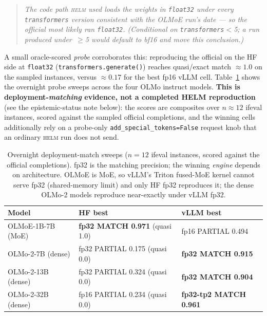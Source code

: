 \documentclass[11pt]{report}
\newcommand{\code}[1]{\texttt{#1}}
\begin{document}
\begin{quote}\itshape
The code path \textsc{helm} used loads the weights in \code{float32} under every
\code{transformers} version consistent with the OLMoE run's date --- so the
official most likely ran \code{float32}. (Conditional on \code{transformers}$<$5;
a run produced under \,$\geq$5 would default to bf16 and move this conclusion.)
\end{quote}

A small oracle-scored \emph{probe} corroborates this: reproducing the official on
the HF side at \code{float32} (\code{transformers.generate()}) reaches quasi/exact
match $\approx 1.0$ on the sampled instances, versus $\approx 0.17$ for the best
fp16 vLLM cell. Table~\ref{tab:fp32} shows the overnight probe sweeps across the
four OLMo instruct models. \textbf{This is deployment-\emph{matching} evidence, not
a completed HELM reproduction} (see the epistemic-status note below): the scores are
composites over $n\approx12$ ifeval instances, scored against the sampled official
completions, and the winning cells additionally rely on a probe-only
\code{add\_special\_tokens=False} request knob that an ordinary \textsc{helm} run
does not send.

\begin{table}[H]
\centering
\small
\begin{tabular}{lll}
\toprule
\textbf{Model} & \textbf{HF best} & \textbf{vLLM best} \\
\midrule
OLMoE-1B-7B (MoE)  & \textbf{fp32 MATCH 0.971} (quasi 1.0) & fp16 PARTIAL 0.494 \\
OLMo-2-7B (dense)  & fp32 PARTIAL 0.175 (quasi 0.0) & \textbf{fp32 MATCH 0.915} \\
OLMo-2-13B (dense) & fp32 PARTIAL 0.324 (quasi 0.0) & \textbf{fp32 MATCH 0.904} \\
OLMo-2-32B (dense) & fp16 PARTIAL 0.234 (quasi 0.0) & \textbf{fp32-tp2 MATCH 0.961} \\
\bottomrule
\end{tabular}
\caption{Overnight deployment-match sweeps ($n=12$ ifeval instances, scored against
the official completions). fp32 is the matching precision; the winning
\emph{engine} depends on architecture. OLMoE is MoE, so vLLM's Triton fused-MoE
kernel cannot serve fp32 (shared-memory limit) and only HF fp32 reproduces it; the
dense OLMo-2 models reproduce near-exactly under vLLM fp32.}
\label{tab:fp32}
\end{table}
\end{document}
